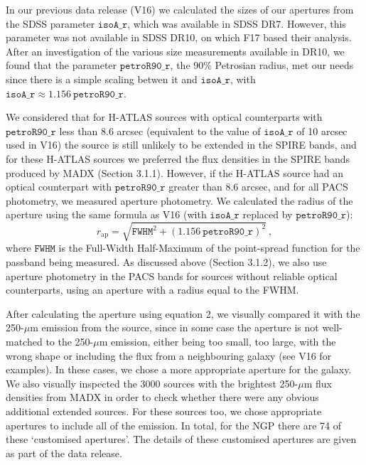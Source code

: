 \documentclass[useAMS,usenatbib]{mn2e}
\begin{document}
In our previous data release (V16) we calculated the sizes of
our apertures from 
the SDSS parameter
$\mathtt{isoA\_r}$, which was available in
SDSS DR7. However, this parameter was not available in SDSS
DR10, on which F17 based their analysis.
After an investigation of the various size measurements available
in DR10, we found that the parameter $\mathtt{petroR90\_r}$,
the 90\% Petrosian radius, met our needs since there
is a simple scaling betwen it and $\mathtt{isoA\_r}$,
with
$\mathtt{isoA\_r} \approx
1.156 \ \mathtt{petroR90\_r}$.

We considered that for H-ATLAS sources
with optical counterparts with $\mathtt{petroR90\_r}$ less than 8.6 arcsec (equivalent
to the value of $\mathtt{isoA\_r}$ of 10 arcsec used in V16)
the source
is still unlikely to be extended in the SPIRE bands, and for these H-ATLAS
sources we preferred the flux
densities in the SPIRE bands produced by MADX (Section 3.1.1).
However, if the H-ATLAS source had an optical counterpart
with $\mathtt{petroR90\_r}$ greater than 8.6 arcsec, and for
all PACS photometry, we measured aperture photometry.
We calculated the radius of the aperture using the 
same formula as V16 (with 
$\mathtt{isoA\_r}$ replaced by $\mathtt{petroR90\_r}$):
\smallskip
\begin{equation} 
r_\mathrm{ap} = \sqrt{ \mathtt{FWHM}^2 + {(1.156
    \ \mathtt{petroR90\_r})}^2}\ , 
\end{equation}
\smallskip
where $\mathtt{FWHM}$ is the Full-Width Half-Maximum of the point-spread
function for the passband being measured. As discussed above
(Section 3.1.2), we also use aperture photometry
in the PACS bands for sources without reliable optical counterparts,
using an aperture with a radius equal to the FWHM.

After calculating the aperture using
equation 2, we visually compared it with
the 250-$\mu$m emission from the
source, since in some case the aperture is not well-matched
to the 250-$\mu$m emission, either being too small, too large,
with the wrong shape or including the flux from a neighbouring
galaxy (see V16 for examples). 
In these cases, we chose
a more appropriate aperture for the galaxy. 
We also visually inspected the 3000 sources with the brightest
250-$\mu$m flux densities from MADX in order to check whether
there were any obvious additional extended sources. 
For these sources too, we chose appropriate apertures
to include all of the emission.
In total, for the NGP there are 74 of these `customised apertures'.
The details
of these customised apertures are given as part of the
data release.
\end{document}
